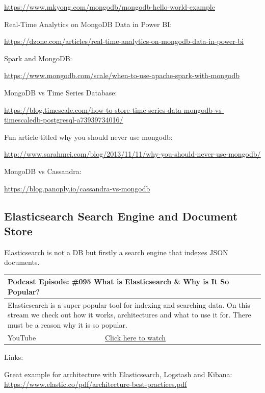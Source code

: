 \documentclass[12pt, numbers=noenddot]{scrreprt} %
\begin{document}
\url{https://www.mkyong.com/mongodb/mongodb-hello-world-example}

Real-Time Analytics on MongoDB Data in Power BI:

\url{https://dzone.com/articles/real-time-analytics-on-mongodb-data-in-power-bi}

Spark and MongoDB:

\url{https://www.mongodb.com/scale/when-to-use-apache-spark-with-mongodb}

MongoDB vs Time Series Database:

\url{https://blog.timescale.com/how-to-store-time-series-data-mongodb-vs-timescaledb-postgresql-a73939734016/}

Fun article titled why you should never use mongodb:

\url{http://www.sarahmei.com/blog/2013/11/11/why-you-should-never-use-mongodb/}

MongoDB vs Cassandra:

\url{https://blog.panoply.io/cassandra-vs-mongodb}

\subsection{Elasticsearch Search Engine and Document Store}

Elasticsearch is not a DB but firstly a search engine that indexes JSON documents.

\begin{table}[htbp]
\begin{tabular}{ll}
\hline
\multicolumn{2}{l}{\textbf{Podcast Episode:} \#095 What is Elasticsearch \& Why is It So Popular?} \\ \hline
\multicolumn{2}{p{15cm}}{Elasticsearch is a super popular tool for indexing and searching data. On this stream we check out how it works, architectures and what to use it for. There must be a reason why it is so popular.}         \\ \hline
\multicolumn{1}{l|}{YouTube}   & \href{https://youtu.be/hNb5zB4OPXM}{Click here to watch}   \\  \hline
\end{tabular}
\end{table}

Links:

Great example for architecture with Elasticsearch, Logstash and Kibana: \\
\url{https://www.elastic.co/pdf/architecture-best-practices.pdf}
\end{document}
